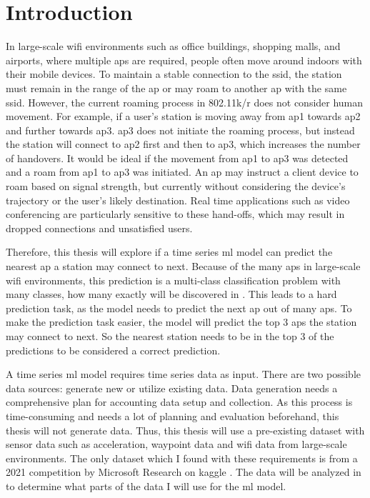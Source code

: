 \chapter{Introduction}\label{ch:intro}

In large-scale \ac{wifi} environments such as office buildings, shopping malls, and airports, where multiple \acp{ap} are required, people often move around indoors with their mobile devices.
To maintain a stable connection to the \ac{ssid}, the station must remain in the range of the \ac{ap} or may roam to another \ac{ap} with the same \ac{ssid}.
However, the current roaming process in 802.11k/r\cite{802.11k}\cite{802.11r} does not consider human movement.
For example, if a user's station is moving away from \ac{ap}1 towards \ac{ap}2 and further towards \ac{ap}3.
\ac{ap}3 does not initiate the roaming process, but instead the station will connect to \ac{ap}2 first and then to \ac{ap}3, which increases the number of handovers.
It would be ideal if the movement from \ac{ap}1 to \ac{ap}3 was detected and a roam from \ac{ap}1 to \ac{ap}3 was initiated.
An \ac{ap} may instruct a client device to roam based on signal strength, but currently without considering the device's trajectory or the user's likely destination.
Real time applications such as video conferencing are particularly sensitive to these hand-offs, which may result in dropped connections and unsatisfied users.

Therefore, this thesis will explore if a time series \ac{ml} model can predict the nearest \ac{ap} a station may connect to next.
Because of the many \acp{ap} in large-scale \ac{wifi} environments, this prediction is a multi-class classification problem with many classes, how many exactly will be discovered in .
This leads to a hard prediction task, as the model needs to predict the next \ac{ap} out of many \acp{ap}.
To make the prediction task easier, the model will predict the top 3 \acp{ap} the station may connect to next.
So the nearest station needs to be in the top 3 of the predictions to be considered a correct prediction.

A time series \ac{ml} model requires time series data as input.
There are two possible data sources: generate new or utilize existing data. 
Data generation needs a comprehensive plan for accounting data setup and collection.
As this process is time-consuming and needs a lot of planning and evaluation beforehand, this thesis will not generate data.
Thus, this thesis will use a pre-existing dataset with sensor data such as acceleration, waypoint data and \ac{wifi} data from large-scale environments.
The only dataset which I found with these requirements is from a 2021 competition by Microsoft Research \cite{IndoorLocationNavigation} on kaggle \cite{kaggle}.
The data will be analyzed in  to determine what parts of the data I will use for the \ac{ml} model.

